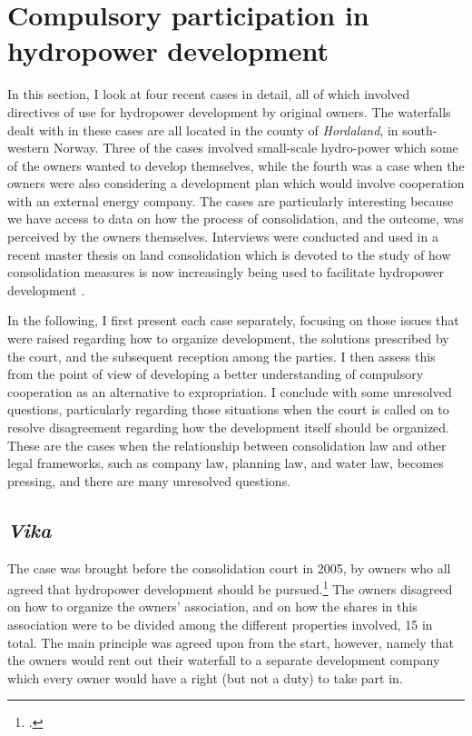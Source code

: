 \section{Compulsory participation in hydropower development}\label{sec:lch}

In this section, I look at four recent cases in detail, all of which involved directives of use for hydropower development by original owners. The waterfalls dealt with in these cases are all located in the county of \emph{Hordaland}, in south-western Norway. Three of the cases involved small-scale hydro-power which some of the owners wanted to develop themselves, while the fourth was a case when the owners were also considering a development plan which would involve cooperation with an external energy company. The cases are particularly interesting because we have access to data on how the process of consolidation, and the outcome, was perceived by the owners themselves. Interviews were conducted and used in a recent master thesis on land consolidation which is devoted to the study of how consolidation measures is now increasingly being used to facilitate hydropower development \cite{stokstad11}.

In the following, I first present each case separately, focusing on those issues that were raised regarding how to organize development, the solutions prescribed by the court, and the subsequent reception among the parties. I then assess this from the point of view of developing a better understanding of compulsory cooperation as an alternative to expropriation. I conclude with some unresolved questions, particularly regarding those situations when the court is called on to resolve disagreement regarding how the development itself should be organized. These are the cases when the relationship between consolidation law and other legal frameworks, such as company law, planning law, and water law, becomes pressing, and there are many unresolved questions.

\subsection{\emph{Vika}}

The case was brought before the consolidation court in 2005, by owners who all agreed that hydropower development should be pursued.\footcite{vika05} The owners disagreed on how to organize the owners' association, and on how the shares in this association were to be divided among the different properties involved, 15 in total. The main principle was agreed upon from the start, however, namely that the owners would rent out their waterfall to a separate development company which every owner would have a right (but not a duty) to take part in. 

